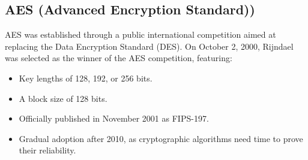 \subsection{AES (Advanced Encryption Standard))}
AES was established through a public international competition aimed at replacing the Data Encryption Standard (DES). On October 2, 2000, Rijndael was selected as the winner of the AES competition, featuring:
\begin{itemize}
    \item Key lengths of 128, 192, or 256 bits.
    \item A block size of 128 bits.
    \item Officially published in November 2001 as FIPS-197.
    \item Gradual adoption after 2010, as cryptographic algorithms need time to prove their reliability.
\end{itemize}

